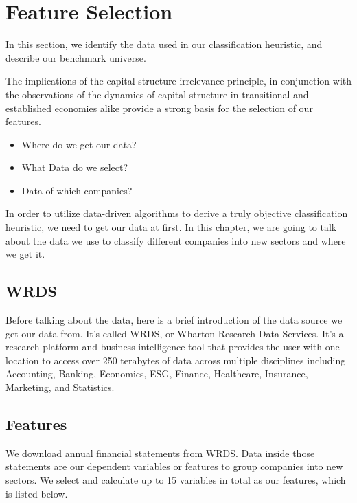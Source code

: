 \documentclass[../main.tex]{subfiles}
\begin{document}
\chapter{Feature Selection} \label{feature_selection}

In this section, we identify the data used in our classification heuristic, and describe our benchmark universe.

The implications of the capital structure irrelevance principle, in conjunction with the observations of the dynamics of capital structure in transitional and established economies alike provide a strong basis for the selection of our features.
  
\begin{itemize}
    \item Where do we get our data?
    \item What Data do we select?
    \item Data of which companies?
\end{itemize}

In order to utilize data-driven algorithms to derive a truly objective classification heuristic, we need to get our data at first. In this chapter, we are going to talk about the data we use to classify different companies into new sectors and where we get it.

\section{WRDS}

Before talking about the data, here is a brief introduction of the data source we get our data from. It's called WRDS, or Wharton Research Data Services. It's a research platform and business intelligence tool that provides the user with one location to access over 250 terabytes of data across multiple disciplines including Accounting, Banking, Economics, ESG, Finance, Healthcare, Insurance, Marketing, and Statistics. 

\section{Features}

We download annual financial statements from WRDS. Data inside those statements are our dependent variables or features to group companies into new sectors. We select and calculate up to 15 variables in total as our features, which is listed below.
\end{document}
